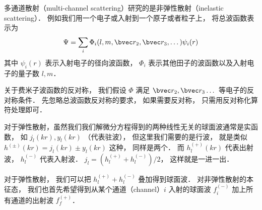 
多通道散射（multi-channel scattering）研究的是非弹性散射（inelastic scattering）． 例如我们用一个电子或入射到一个原子或者粒子上， 将总波函数表示为
\begin{equation}
\Psi = \sum_i \Phi_i (l, m, \bvec r_2, \bvec r_3, \dots) \psi_i (r)
\end{equation}
其中 $\psi_i(r)$ 表示入射电子的径向波函数， $\Phi_i$ 表示其他田子的波函数以及入射电子的量子数 $l, m$．

关于费米子波函数的反对称， 我们假设 $\Phi$ 满足 $\bvec r_2, \bvec r_3 \dots$ 等电子的反对称条件． 先忽略总波函数反对称的要求， 如果需要反对称， 只需用反对称化算符处理即可．

对于弹性散射，虽然我们我们解微分方程得到的两种线性无关的球面波通常是实函数， 如 $j_l(kr), y_l(kr)$ （代表驻波）， 但这里我们需要的是行波， 就是类似 $h^{(\pm)}(kr) = j_l(kr) \pm y_l(kr)$ 这种， 同样是两个． 而 $h_l^{(+)}(kr)$ 代表出射波， $h_l^{(-)}$ 代表入射波． $j_l = (h_l^{(+)} + h_l^{(-)})/2$， 这样就是一进一出．

对于弹性散射， 我们可以把 $h_l^{(+)} + h_l^{(-)}$ 叠加得到球面波． 对非弹性散射的本征态， 我们也首先希望得到从某个通道（channel）$i$ 入射的球面波 $f_i^{(-)}$ 加上所有通道的出射波 $f_f^{(+)}$．
